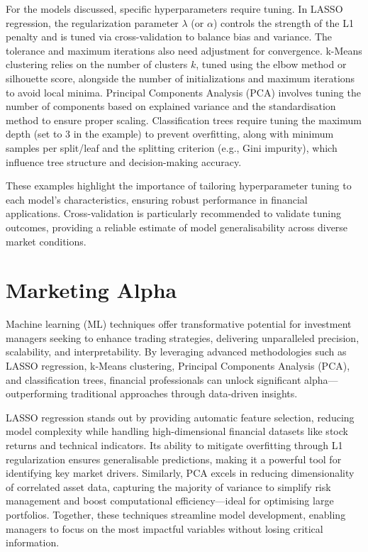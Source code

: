 \documentclass{article}
\begin{document}
For the models discussed, specific hyperparameters require tuning. In LASSO regression, the regularization parameter \(\lambda\) (or \(\alpha\)) controls the strength of the L1 penalty and is tuned via cross-validation to balance bias and variance. The tolerance and maximum iterations also need adjustment for convergence. k-Means clustering relies on the number of clusters \(k\), tuned using the elbow method or silhouette score, alongside the number of initializations and maximum iterations to avoid local minima. Principal Components Analysis (PCA) involves tuning the number of components based on explained variance and the standardisation method to ensure proper scaling. Classification trees require tuning the maximum depth (set to 3 in the example) to prevent overfitting, along with minimum samples per split/leaf and the splitting criterion (e.g., Gini impurity), which influence tree structure and decision-making accuracy.

These examples highlight the importance of tailoring hyperparameter tuning to each model’s characteristics, ensuring robust performance in financial applications. Cross-validation is particularly recommended to validate tuning outcomes, providing a reliable estimate of model generalisability across diverse market conditions.

\section{Marketing Alpha}
\label{sec:marketing_alpha}

Machine learning (ML) techniques offer transformative potential for investment managers seeking to enhance trading strategies, delivering unparalleled precision, scalability, and interpretability. By leveraging advanced methodologies such as LASSO regression, k-Means clustering, Principal Components Analysis (PCA), and classification trees, financial professionals can unlock significant alpha—outperforming traditional approaches through data-driven insights.

LASSO regression stands out by providing automatic feature selection, reducing model complexity while handling high-dimensional financial datasets like stock returns and technical indicators. Its ability to mitigate overfitting through L1 regularization ensures generalisable predictions, making it a powerful tool for identifying key market drivers. Similarly, PCA excels in reducing dimensionality of correlated asset data, capturing the majority of variance to simplify risk management and boost computational efficiency—ideal for optimising large portfolios. Together, these techniques streamline model development, enabling managers to focus on the most impactful variables without losing critical information.
\end{document}
